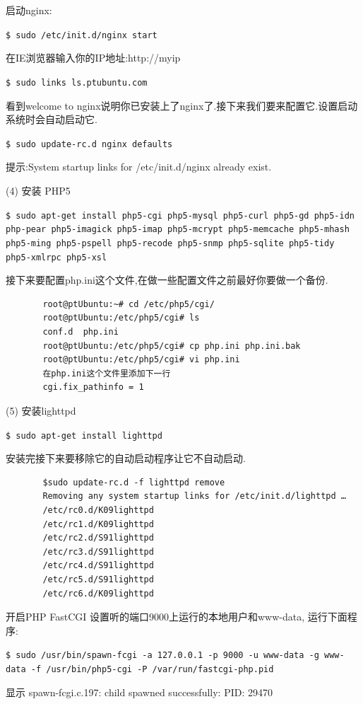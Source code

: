 启动nginx:

\verb"$ sudo /etc/init.d/nginx start"

在IE浏览器输入你的IP地址:http://myip

\verb"$ sudo links ls.ptubuntu.com"

看到welcome to nginx说明你已安装上了nginx了.接下来我们要来配置它.设置启动系统时会自动启动它.

\verb"$ sudo update-rc.d nginx defaults"

提示:System startup links for /etc/init.d/nginx already exist.

(4) 安装 PHP5

\verb"$ sudo apt-get install php5-cgi php5-mysql php5-curl php5-gd php5-idn php-pear php5-imagick php5-imap php5-mcrypt php5-memcache php5-mhash php5-ming php5-pspell php5-recode php5-snmp php5-sqlite php5-tidy php5-xmlrpc php5-xsl"

接下来要配置php.ini这个文件,在做一些配置文件之前最好你要做一个备份.
\begin{verbatim}
　　    root@ptUbuntu:~# cd /etc/php5/cgi/
　　    root@ptUbuntu:/etc/php5/cgi# ls
　　    conf.d  php.ini
　　    root@ptUbuntu:/etc/php5/cgi# cp php.ini php.ini.bak
　　    root@ptUbuntu:/etc/php5/cgi# vi php.ini
　　    在php.ini这个文件里添加下一行
　　    cgi.fix_pathinfo = 1
\end{verbatim}

(5) 安装lighttpd

\verb"$ sudo apt-get install lighttpd"

安装完接下来要移除它的自动启动程序让它不自动启动.
\begin{verbatim}
　　    $sudo update-rc.d -f lighttpd remove
　　    Removing any system startup links for /etc/init.d/lighttpd …
　　    /etc/rc0.d/K09lighttpd
　　    /etc/rc1.d/K09lighttpd
　　    /etc/rc2.d/S91lighttpd
　　    /etc/rc3.d/S91lighttpd
　　    /etc/rc4.d/S91lighttpd
　　    /etc/rc5.d/S91lighttpd
　　    /etc/rc6.d/K09lighttpd
\end{verbatim}

开启PHP FastCGI 设置听的端口9000上运行的本地用户和www-data, 运行下面程序:

\verb"$ sudo /usr/bin/spawn-fcgi -a 127.0.0.1 -p 9000 -u www-data -g www-data -f /usr/bin/php5-cgi -P /var/run/fastcgi-php.pid"

显示 spawn-fcgi.c.197: child spawned successfully: PID: 29470

